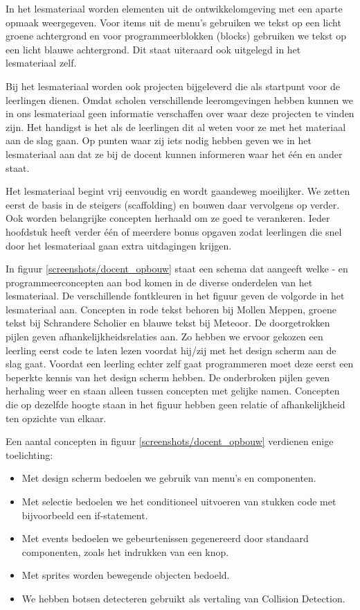 \documentclass{BYUTextbook}
\begin{document}
In het lesmateriaal worden elementen uit de ontwikkelomgeving met een aparte opmaak weergegeven. Voor items uit de menu's gebruiken we tekst op een licht groene achtergrond en voor programmeerblokken (blocks) gebruiken we tekst op een licht blauwe achtergrond. Dit staat uiteraard ook uitgelegd in het lesmateriaal zelf.

Bij het lesmateriaal worden ook projecten bijgeleverd die als startpunt voor de leerlingen dienen. Omdat scholen verschillende leeromgevingen hebben kunnen we in ons lesmateriaal geen informatie verschaffen over waar deze projecten te vinden zijn. Het handigst is het als de leerlingen dit al weten voor ze met het materiaal aan de slag gaan. Op punten waar zij iets nodig hebben geven we in het lesmateriaal aan dat ze bij de docent kunnen informeren waar het \'e\'en en ander staat.

Het lesmateriaal begint vrij eenvoudig en wordt gaandeweg moeilijker. We zetten eerst de basis in de steigers (scaffolding) en bouwen daar vervolgens op verder. Ook worden belangrijke concepten herhaald om ze goed te verankeren. Ieder hoofdstuk heeft verder \'e\'en of meerdere bonus opgaven zodat leerlingen die snel door het lesmateriaal gaan extra uitdagingen krijgen.

In figuur \ref{screenshots/docent_opbouw} staat een schema dat aangeeft welke \ai- en programmeerconcepten aan bod komen in de diverse onderdelen van het lesmateriaal. De verschillende fontkleuren in het figuur geven de volgorde in het lesmateriaal aan. Concepten in rode tekst behoren bij Mollen Meppen, groene tekst bij Schrandere Scholier en blauwe tekst bij Meteoor. De doorgetrokken pijlen geven afhankelijkheidsrelaties aan. Zo hebben we ervoor gekozen een leerling eerst code te laten lezen voordat hij/zij met het design scherm aan de slag gaat. Voordat een leerling echter zelf gaat programmeren moet deze eerst een beperkte kennis van het design scherm hebben. De onderbroken pijlen geven herhaling weer en staan alleen tussen concepten met gelijke namen. Concepten die op dezelfde hoogte staan in het figuur hebben geen relatie of afhankelijkheid ten opzichte van elkaar.

Een aantal concepten in figuur \ref{screenshots/docent_opbouw} verdienen enige toelichting:
\begin{itemize}
  \item Met design scherm bedoelen we gebruik van menu's en componenten.
  \item Met selectie bedoelen we het conditioneel uitvoeren van stukken code met bijvoorbeeld een if-statement.
  \item Met events bedoelen we gebeurtenissen gegenereerd door standaard componenten, zoals het indrukken van een knop.
  \item Met sprites worden bewegende objecten bedoeld.
  \item We hebben botsen detecteren gebruikt als vertaling van Collision Detection.
\end{itemize}
 
\end{document}
